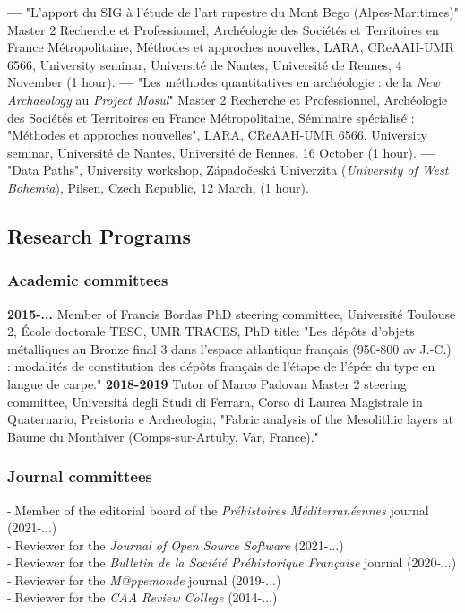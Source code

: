 \documentclass{article}
\begin{document}
\smallbreak
\textbf{--- }"L'apport du SIG \`{a} l'\'{e}tude de l'art rupestre du Mont Bego (Alpes-Maritimes)" Master 2 Recherche et Professionnel, Arch\'{e}ologie des Soci\'{e}t\'{e}s et Territoires en France M\'{e}tropolitaine, M\'{e}thodes et approches nouvelles, LARA, CReAAH-UMR 6566, University seminar, Universit\'{e} de Nantes, Universit\'{e} de Rennes, 4 November (1 hour).
\smallbreak
\textbf{--- }"Les m\'{e}thodes quantitatives en arch\'{e}ologie : de la \textit{New Archaeology} au \textit{Project Mosul}" Master 2 Recherche et Professionnel, Arch\'{e}ologie des Soci\'{e}t\'{e}s et Territoires en France M\'{e}tropolitaine, S\'{e}minaire sp\'{e}cialis\'{e} : "M\'{e}thodes et approches nouvelles", LARA, CReAAH-UMR 6566, University seminar, Universit\'{e} de Nantes, Universit\'{e} de Rennes, 16 October (1 hour).
\smallbreak
\textbf{--- }"Data Paths", University workshop, Z\'{a}pado\v{c}esk\'{a} Univerzita (\textit{University of West Bohemia}), Pilsen, Czech Republic, 12 March, (1 hour).

\subsection*{Research Programs}

\subsubsection*{Academic committees}

\textbf{2015-... }Member of Francis Bordas PhD steering committee, Universit\'{e} Toulouse 2, \'{E}cole doctorale TESC, UMR TRACES, PhD title: "Les d\'{e}p\^{o}ts d'objets m\'{e}talliques au Bronze final 3 dans l'espace atlantique fran\c{c}ais (950-800 av J.-C.) : modalit\'{e}s de constitution des d\'{e}p\^{o}ts fran\c{c}ais de l'\'{e}tape de l'\'{e}p\'{e}e du type en langue de carpe."
\smallbreak
\textbf{2018-2019 }Tutor of Marco Padovan Master 2 steering committee, Universit\'{a} degli Studi di Ferrara, Corso di Laurea Magistrale in Quaternario, Preistoria e Archeologia, "Fabric analysis of the Mesolithic layers at Baume du Monthiver (Comps-sur-Artuby, Var, France)."

\subsubsection*{Journal committees}

-.Member of the editorial board of the \textit{Pr\'{e}histoires M\'{e}diterran\'{e}ennes} journal (2021-...)\\ 
-.Reviewer for the \textit{Journal of Open Source Software} (2021-...)\\
-.Reviewer for the \textit{Bulletin de la Soci\'{e}t\'{e} Pr\'{e}historique Fran\c{c}aise} journal (2020-...)\\
-.Reviewer for the \textit{M@ppemonde} journal (2019-...)\\ 
-.Reviewer for the \textit{CAA Review College} (2014-...)\\ 
\end{document}
